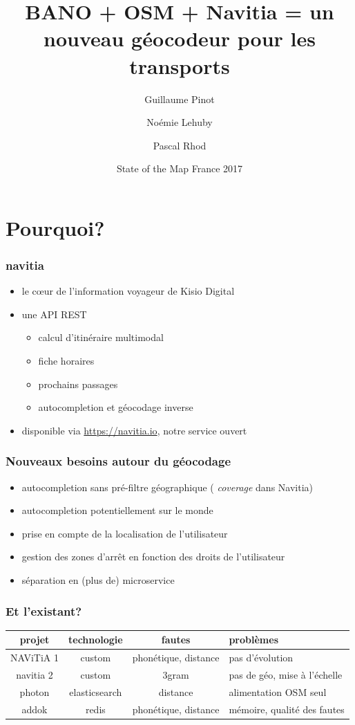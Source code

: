 \documentclass[table]{beamer}
\title[BANO + OSM + Navitia]{BANO + OSM + Navitia = un nouveau géocodeur pour les transports}
\author{Guillaume Pinot \and Noémie Lehuby \and Pascal Rhod}
\institute[Kisio Digital] %
{
  Kisio Digital\\
  20 rue Hector Malot\\
  75012 Paris, France}
\date{State of the Map France 2017}
\newcommand*{\foreign}[2][english]{%
    \emph{\foreignlanguage{#1}{#2}}%
}
\begin{document}
\begin{frame}
  \titlepage
\end{frame}

\section{Pourquoi?}

\begin{frame}
  \frametitle{navitia}

  \begin{itemize}
  \item le cœur de l'information voyageur de Kisio Digital
  \item une API REST
    \begin{itemize}
    \item calcul d'itinéraire multimodal
    \item fiche horaires
    \item prochains passages
    \item autocompletion et géocodage inverse
    \end{itemize}
  \item disponible via \url{https://navitia.io}, notre service ouvert
  \end{itemize}
\end{frame}

\begin{frame}
  \frametitle{Nouveaux besoins autour du géocodage}

  \begin{itemize}
  \item autocompletion sans pré-filtre géographique (\foreign{coverage} dans Navitia)
  \item autocompletion potentiellement sur le monde
  \item prise en compte de la localisation de l'utilisateur
  \item gestion des zones d'arrêt en fonction des droits de l'utilisateur
  \item séparation en (plus de) microservice
  \end{itemize}
\end{frame}

\begin{frame}
  \frametitle{Et l'existant?}

  \centering\footnotesize
  \begin{tabular}{|c|ccl|}
    \hline
    projet & technologie & fautes & problèmes\\
    \hline
    NAViTiA 1 & custom & phonétique, distance & pas d'évolution\\
    navitia 2 & custom & 3gram & pas de géo, mise à l'échelle\\
    photon & elasticsearch & distance & alimentation OSM seul\\
    addok & redis & phonétique, distance & mémoire, qualité des fautes\\
    \hline
  \end{tabular}
\end{frame}
\end{document}

